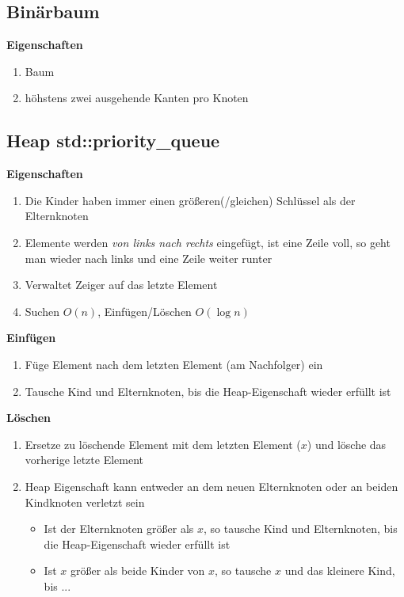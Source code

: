 \subsection{Binärbaum}
\textbf{Eigenschaften}
\begin{enumerate}
    \item Baum
    \item höhstens zwei ausgehende Kanten pro Knoten
\end{enumerate}

\subsection{Heap std::priority\_queue}
\textbf{Eigenschaften}
\begin{enumerate}
    \item Die Kinder haben immer einen größeren(/gleichen) Schlüssel als der Elternknoten
    \item Elemente werden \textit{von links nach rechts} eingefügt, ist eine Zeile voll, so geht man wieder nach links und eine Zeile weiter runter
    \item Verwaltet Zeiger auf das letzte Element
    \item Suchen $O(n)$, Einfügen/Löschen $O(\log n)$
\end{enumerate}

\textbf{Einfügen}
\begin{enumerate}
    \item Füge Element nach dem letzten Element (am Nachfolger) ein
    \item Tausche Kind und Elternknoten, bis die Heap-Eigenschaft wieder erfüllt ist
\end{enumerate}

\textbf{Löschen}
\begin{enumerate}
    \item Ersetze zu löschende Element mit dem letzten Element ($x$) und lösche das vorherige letzte Element
    \item Heap Eigenschaft kann entweder an dem neuen Elternknoten oder an beiden Kindknoten verletzt sein
          \begin{itemize}
              \item Ist der Elternknoten größer als $x$, so tausche Kind und Elternknoten, bis die Heap-Eigenschaft wieder erfüllt ist
              \item Ist $x$ größer als beide Kinder von $x$, so tausche $x$ und das kleinere Kind, bis ...
          \end{itemize}
\end{enumerate}

